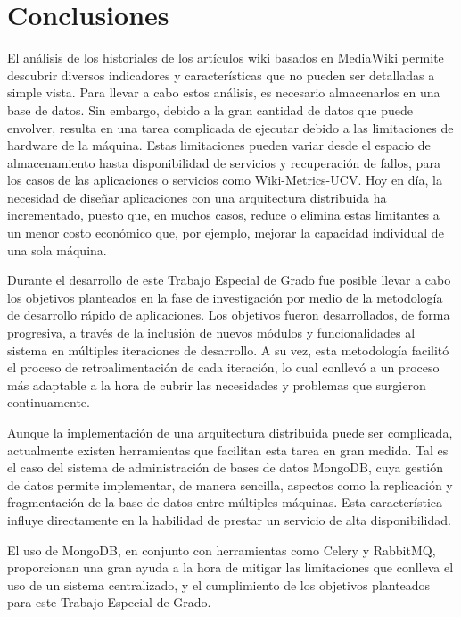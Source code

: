 \section{Conclusiones}

El análisis de los historiales de los artículos wiki basados en MediaWiki permite
descubrir diversos indicadores y características que no pueden ser detalladas a simple
vista.
Para llevar a cabo estos análisis, es necesario almacenarlos en una base
de datos. Sin embargo, debido a la gran cantidad de datos que puede envolver, resulta
en una tarea complicada de ejecutar debido a las limitaciones de hardware de la
máquina.
Estas limitaciones pueden variar desde el espacio de almacenamiento hasta disponibilidad
de servicios y recuperación de fallos, para los casos de las aplicaciones o servicios como
Wiki-Metrics-UCV.
Hoy en día, la necesidad de diseñar aplicaciones con una arquitectura distribuida
ha incrementado, puesto que, en muchos casos, reduce o elimina estas limitantes
a un menor costo económico que, por ejemplo, mejorar la capacidad individual de una sola máquina.

Durante el desarrollo de este Trabajo Especial de Grado
fue posible llevar a cabo los objetivos planteados en la fase de investigación por medio
de la metodología de desarrollo rápido de aplicaciones.
Los objetivos fueron desarrollados, de forma progresiva, a través de la inclusión de nuevos módulos y funcionalidades al sistema en múltiples iteraciones de desarrollo.
A su vez, esta metodología facilitó el proceso de retroalimentación de cada iteración,
lo cual conllevó a un proceso más adaptable a la hora de cubrir las necesidades y problemas que surgieron continuamente.

Aunque la implementación de una arquitectura distribuida puede ser complicada,
actualmente existen herramientas que facilitan esta tarea en gran medida.
Tal es el caso del sistema de administración de bases de datos MongoDB, cuya gestión
de datos permite implementar, de manera sencilla, aspectos como la replicación y fragmentación de la base de datos entre múltiples máquinas.
Esta característica influye directamente en la habilidad de prestar un servicio de alta disponibilidad.

El uso de MongoDB, en conjunto con herramientas como Celery y RabbitMQ, proporcionan
una gran ayuda a la hora de mitigar las limitaciones que conlleva el uso de un sistema centralizado, y el cumplimiento de los objetivos planteados para este Trabajo Especial de Grado.

